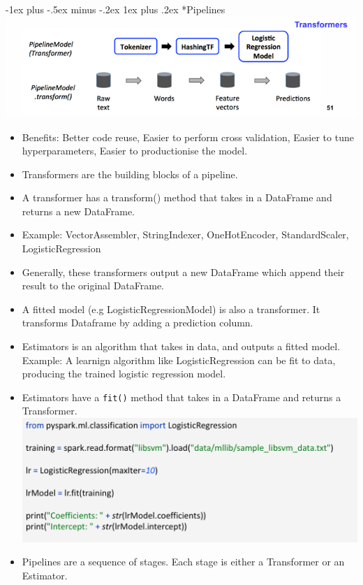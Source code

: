 \documentclass[10pt, landscape]{article}
\makeatletter
\renewcommand{\subsubsection}{\@startsection{subsubsection}{3}{0mm}%
  {-1ex plus -.5ex minus -.2ex}%
  {1ex plus .2ex}%
{\normalfont\small\bfseries}}%
\makeatother
\begin{document}
\begin{multicols*}{4}
  \subsubsection*{Pipelines}
  \includegraphics[width=0.95\linewidth]{pipeline_model.png} 
  \begin{itemize}
    \item Benefits: Better code reuse, Easier to perform cross validation, Easier to tune hyperparameters, Easier to productionise the model.
    \item Transformers are the building blocks of a pipeline.
    \item A transformer has a transform() method that takes in a DataFrame and returns a new DataFrame.
    \item Example: VectorAssembler, StringIndexer, OneHotEncoder, StandardScaler, LogisticRegression
    \item Generally, these transformers output a new DataFrame which append their result to the original DataFrame. 
    \item A fitted model (e.g LogisticRegressionModel) is also a transformer. It transforms Dataframe by adding a prediction column.
    \item Estimators is an algorithm that takes in data, and outputs a fitted model. Example: A learnign algorithm like LogisticRegression can be fit to data, producing the trained logistic regression model.
    \item Estimators have a \texttt{fit()} method that takes in a DataFrame and returns a Transformer.
          \includegraphics[width=0.95\linewidth]{estimator.png} 
    \item Pipelines are a sequence of stages. Each stage is either a Transformer or an Estimator.

\end{itemize}
\end{multicols*}
\end{document}
